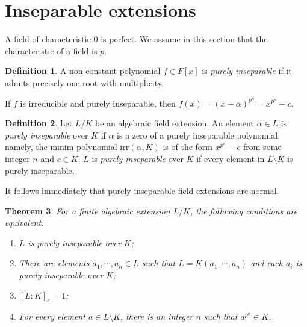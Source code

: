 \documentclass[12pt]{report}
\newtheorem{thm}{Theorem}[section]
\theoremstyle{definition}
\newtheorem{defn}[thm]{Definition}
\def\aa{\alpha}
\def\irr{\text{irr}}
\begin{document}
\section{Inseparable extensions}

A field of characteristic 0 is perfect. We assume in this section that the characteristic of a field is $p$.

\begin{defn}
    A non-constant polynomial $f\in F[x]$ is \emph{purely inseparable} if it admits precisely one root with multiplicity.
\end{defn}

If $f$ is irreducible and purely inseparable, then $f(x)=(x-\aa)^{p^n} = x^{p^n}-c$. 

\begin{defn}
    Let $L/K$ be an algebraic field extension. An element $\aa\in L$ is \emph{purely inseparable} over $K$ if $\aa$ is a zero of a purely inseparable polynomial, namely, the minim polynomial $\irr(\aa,K)$ is of the form $x^{p^n}-c$ from some integer $n$ and $c\in K$. $L$ is \emph{purely inseparable} over $K$ if every element in $L\setminus K$ is purely inseparable.
\end{defn}

It follows immediately that purely inseparable field extensions are normal.

\begin{thm}
    For a finite algebraic extension $L/K$, the following conditions are equivalent: \begin{enumerate}
        \item $L$ is purely inseparable over $K$;
        \item There are elements $a_1,\cdots,a_n\in L$ such that $L=K(a_1,\cdots,a_n)$ and each $a_i$ is purely inseparable over $K$;
        \item $[L:K]_s=1$;
        \item For every element $a\in L\setminus K$, there is an integer $n$ such that $a^{p^n}\in K$.
    \end{enumerate}
\end{thm}
\end{document}
